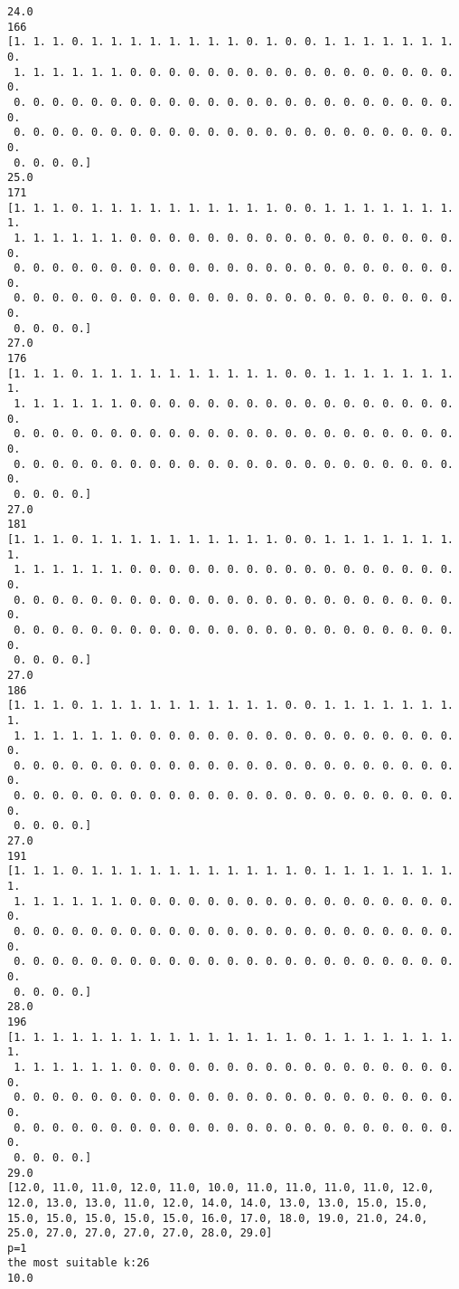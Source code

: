 \documentclass[11pt]{article}
\begin{document}
\begin{Verbatim}[commandchars=\\\{\}]
24.0
166
[1. 1. 1. 0. 1. 1. 1. 1. 1. 1. 1. 1. 0. 1. 0. 0. 1. 1. 1. 1. 1. 1. 1. 0.
 1. 1. 1. 1. 1. 1. 0. 0. 0. 0. 0. 0. 0. 0. 0. 0. 0. 0. 0. 0. 0. 0. 0. 0.
 0. 0. 0. 0. 0. 0. 0. 0. 0. 0. 0. 0. 0. 0. 0. 0. 0. 0. 0. 0. 0. 0. 0. 0.
 0. 0. 0. 0. 0. 0. 0. 0. 0. 0. 0. 0. 0. 0. 0. 0. 0. 0. 0. 0. 0. 0. 0. 0.
 0. 0. 0. 0.]
25.0
171
[1. 1. 1. 0. 1. 1. 1. 1. 1. 1. 1. 1. 1. 1. 0. 0. 1. 1. 1. 1. 1. 1. 1. 1.
 1. 1. 1. 1. 1. 1. 0. 0. 0. 0. 0. 0. 0. 0. 0. 0. 0. 0. 0. 0. 0. 0. 0. 0.
 0. 0. 0. 0. 0. 0. 0. 0. 0. 0. 0. 0. 0. 0. 0. 0. 0. 0. 0. 0. 0. 0. 0. 0.
 0. 0. 0. 0. 0. 0. 0. 0. 0. 0. 0. 0. 0. 0. 0. 0. 0. 0. 0. 0. 0. 0. 0. 0.
 0. 0. 0. 0.]
27.0
176
[1. 1. 1. 0. 1. 1. 1. 1. 1. 1. 1. 1. 1. 1. 0. 0. 1. 1. 1. 1. 1. 1. 1. 1.
 1. 1. 1. 1. 1. 1. 0. 0. 0. 0. 0. 0. 0. 0. 0. 0. 0. 0. 0. 0. 0. 0. 0. 0.
 0. 0. 0. 0. 0. 0. 0. 0. 0. 0. 0. 0. 0. 0. 0. 0. 0. 0. 0. 0. 0. 0. 0. 0.
 0. 0. 0. 0. 0. 0. 0. 0. 0. 0. 0. 0. 0. 0. 0. 0. 0. 0. 0. 0. 0. 0. 0. 0.
 0. 0. 0. 0.]
27.0
181
[1. 1. 1. 0. 1. 1. 1. 1. 1. 1. 1. 1. 1. 1. 0. 0. 1. 1. 1. 1. 1. 1. 1. 1.
 1. 1. 1. 1. 1. 1. 0. 0. 0. 0. 0. 0. 0. 0. 0. 0. 0. 0. 0. 0. 0. 0. 0. 0.
 0. 0. 0. 0. 0. 0. 0. 0. 0. 0. 0. 0. 0. 0. 0. 0. 0. 0. 0. 0. 0. 0. 0. 0.
 0. 0. 0. 0. 0. 0. 0. 0. 0. 0. 0. 0. 0. 0. 0. 0. 0. 0. 0. 0. 0. 0. 0. 0.
 0. 0. 0. 0.]
27.0
186
[1. 1. 1. 0. 1. 1. 1. 1. 1. 1. 1. 1. 1. 1. 0. 0. 1. 1. 1. 1. 1. 1. 1. 1.
 1. 1. 1. 1. 1. 1. 0. 0. 0. 0. 0. 0. 0. 0. 0. 0. 0. 0. 0. 0. 0. 0. 0. 0.
 0. 0. 0. 0. 0. 0. 0. 0. 0. 0. 0. 0. 0. 0. 0. 0. 0. 0. 0. 0. 0. 0. 0. 0.
 0. 0. 0. 0. 0. 0. 0. 0. 0. 0. 0. 0. 0. 0. 0. 0. 0. 0. 0. 0. 0. 0. 0. 0.
 0. 0. 0. 0.]
27.0
191
[1. 1. 1. 0. 1. 1. 1. 1. 1. 1. 1. 1. 1. 1. 1. 0. 1. 1. 1. 1. 1. 1. 1. 1.
 1. 1. 1. 1. 1. 1. 0. 0. 0. 0. 0. 0. 0. 0. 0. 0. 0. 0. 0. 0. 0. 0. 0. 0.
 0. 0. 0. 0. 0. 0. 0. 0. 0. 0. 0. 0. 0. 0. 0. 0. 0. 0. 0. 0. 0. 0. 0. 0.
 0. 0. 0. 0. 0. 0. 0. 0. 0. 0. 0. 0. 0. 0. 0. 0. 0. 0. 0. 0. 0. 0. 0. 0.
 0. 0. 0. 0.]
28.0
196
[1. 1. 1. 1. 1. 1. 1. 1. 1. 1. 1. 1. 1. 1. 1. 0. 1. 1. 1. 1. 1. 1. 1. 1.
 1. 1. 1. 1. 1. 1. 0. 0. 0. 0. 0. 0. 0. 0. 0. 0. 0. 0. 0. 0. 0. 0. 0. 0.
 0. 0. 0. 0. 0. 0. 0. 0. 0. 0. 0. 0. 0. 0. 0. 0. 0. 0. 0. 0. 0. 0. 0. 0.
 0. 0. 0. 0. 0. 0. 0. 0. 0. 0. 0. 0. 0. 0. 0. 0. 0. 0. 0. 0. 0. 0. 0. 0.
 0. 0. 0. 0.]
29.0
[12.0, 11.0, 11.0, 12.0, 11.0, 10.0, 11.0, 11.0, 11.0, 11.0, 12.0, 12.0, 13.0, 13.0, 11.0, 12.0, 14.0, 14.0, 13.0, 13.0, 15.0, 15.0, 15.0, 15.0, 15.0, 15.0, 15.0, 16.0, 17.0, 18.0, 19.0, 21.0, 24.0, 25.0, 27.0, 27.0, 27.0, 27.0, 28.0, 29.0]
p=1
the most suitable k:26
10.0

    \end{Verbatim}
\end{document}
